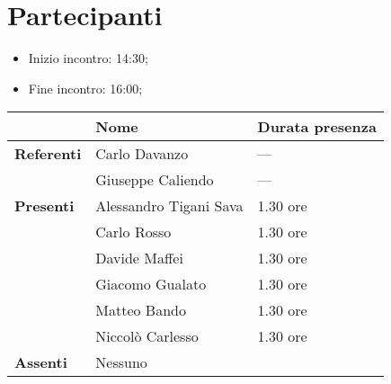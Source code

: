 \section{Partecipanti}

\begin{itemize}
    \item Inizio incontro: 14:30;
	\item Fine incontro: 16:00;
\end{itemize}


\begin{center}
{\renewcommand{\arraystretch}{1.5}
\begin{tabular}{l|ll}
	                    & \textbf{Nome}  & \textbf{Durata presenza} 	\\
	\hline 
	\textbf{Referenti} & Carlo Davanzo & --- \\
	& Giuseppe Caliendo & --- \\
	\hline
	\textbf{Presenti}   & Alessandro Tigani Sava            & 1.30 ore     
	\\  & Carlo Rosso           & 1.30 ore     
	\\  & Davide Maffei          & 1.30 ore     
	\\  & Giacomo Gualato            & 1.30 ore     
	\\  & Matteo Bando        & 1.30 ore    
	\\  & Niccolò Carlesso       & 1.30 ore     \\
	\hline
	\textbf{Assenti}	& 	     Nessuno    &	        \\
\end{tabular}	
}
\end{center}
